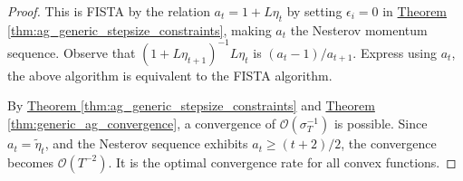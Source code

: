 \documentclass[12pt]{article}
\begin{document}
\begin{proof}
            This is FISTA by the relation $a_t = 1 + L\eta_t$ by setting $\epsilon_i = 0$ in
            \hyperref[thm:ag_generic_stepsize_constraints]
            {Theorem \ref*{thm:ag_generic_stepsize_constraints}}, 
            making $a_t$ the Nesterov momentum sequence. 
            Observe that $(1 + L\eta_{t + 1})^{-1}L\eta_t$ is $(a_t - 1)/a_{t + 1}$.
            Express using $a_t$, the above algorithm is equivalent to the FISTA algorithm. 
            \par
            By 
            \hyperref[thm:ag_generic_stepsize_constraints]{Theorem \ref*{thm:ag_generic_stepsize_constraints}}
            and 
            \hyperref[thm:generic_ag_convergence]{Theorem \ref*{thm:generic_ag_convergence}},
            a convergence of $\mathcal O(\sigma_T^{-1})$ is possible. 
            Since $a_t = \tilde \eta_t$, and the Nesterov sequence exhibits $a_{t} \ge (t + 2)/2$, the convergence becomes $\mathcal O(T^{-2})$. 
            It is the optimal convergence rate for all convex functions. 
        \end{proof}
\end{document}
